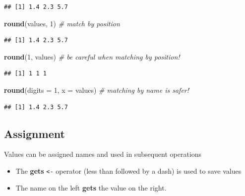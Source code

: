 \documentclass[]{book}
\newenvironment{Shaded}{\begin{snugshade}}{\end{snugshade}}
\newcommand{\CommentTok}[1]{\textcolor[rgb]{0.56,0.35,0.01}{\textit{#1}}}
\newcommand{\DataTypeTok}[1]{\textcolor[rgb]{0.13,0.29,0.53}{#1}}
\newcommand{\DecValTok}[1]{\textcolor[rgb]{0.00,0.00,0.81}{#1}}
\newcommand{\KeywordTok}[1]{\textcolor[rgb]{0.13,0.29,0.53}{\textbf{#1}}}
\newcommand{\NormalTok}[1]{#1}
\providecommand{\tightlist}{%
  \setlength{\itemsep}{0pt}\setlength{\parskip}{0pt}}
\begin{document}
\begin{verbatim}
## [1] 1.4 2.3 5.7
\end{verbatim}

\begin{Shaded}
\begin{Highlighting}[]
\KeywordTok{round}\NormalTok{(values, }\DecValTok{1}\NormalTok{) }\CommentTok{# match by position}
\end{Highlighting}
\end{Shaded}

\begin{verbatim}
## [1] 1.4 2.3 5.7
\end{verbatim}

\begin{Shaded}
\begin{Highlighting}[]
\KeywordTok{round}\NormalTok{(}\DecValTok{1}\NormalTok{, values) }\CommentTok{# be careful when matching by position!}
\end{Highlighting}
\end{Shaded}

\begin{verbatim}
## [1] 1 1 1
\end{verbatim}

\begin{Shaded}
\begin{Highlighting}[]
\KeywordTok{round}\NormalTok{(}\DataTypeTok{digits =} \DecValTok{1}\NormalTok{, }\DataTypeTok{x =}\NormalTok{ values) }\CommentTok{# matching by name is safer!}
\end{Highlighting}
\end{Shaded}

\begin{verbatim}
## [1] 1.4 2.3 5.7
\end{verbatim}

\hypertarget{assignment}{%
\subsection{Assignment}\label{assignment}}

Values can be assigned names and used in subsequent operations

\begin{itemize}
\tightlist
\item
  The \textbf{gets} \texttt{\textless{}-} operator (less than followed by a dash) is used to save values
\item
  The name on the left \textbf{gets} the value on the right.
\end{itemize}
\end{document}
